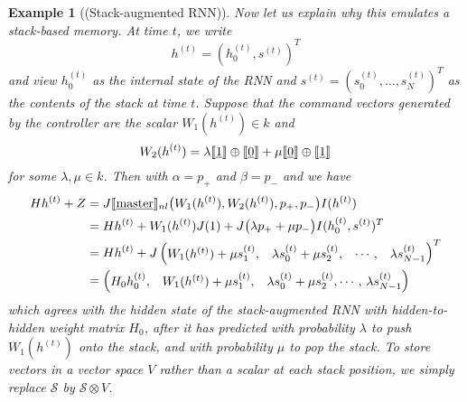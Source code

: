 \documentclass[english,letter paper,12pt,leqno]{article}
\theoremstyle{example}
\newtheorem{example}[theorem]{Example}
\numberwithin{equation}{section}
\begin{document}
\begin{example}[(Stack-augmented RNN)]
Now let us explain why this emulates a stack-based memory. At time $t$, we write
\[
h^{(t)} = (h_0^{(t)}, s^{(t)})^T
\]
and view $h_0^{(t)}$ as the internal state of the RNN and $s^{(t)} = (s_0^{(t)}, \ldots, s_N^{(t)})^T$ as the contents of the stack at time $t$. Suppose that the command vectors generated by the controller are the scalar $W_1(h^{(t)}) \in k$ and
\[
W_2(h^{(t)}) = \lambda \llbracket \underline{1} \rrbracket \oplus \llbracket \underline{0} \rrbracket + \mu \llbracket \underline{0} \rrbracket \oplus \llbracket \underline{1} \rrbracket
\]
for some $\lambda,\mu \in k$.
Then with $\alpha = p_{+}$ and $\beta = p_{-}$ and  we have
\begin{align*}
H h^{(t)} + Z &= J\llbracket \underline{\textup{master}} \rrbracket_{nl}\big( W_1(h^{(t)}), W_2(h^{(t)}), p_+, p_-\big)I( h^{(t)} )\\
&= H h^{(t)} + W_1(h^{(t)}) J(1) + J\big( \lambda p_+ + \mu p_{-} \big)I( h_0^{(t)}, s^{(t)})^T\\
&= H h^{(t)} + J\begin{pmatrix} W_1(h^{(t)}) + \mu s_1^{(t)}, & \lambda s_0^{(t)} + \mu s_2^{(t)}, & \cdots, & \lambda s_{N-1}^{(t)} \end{pmatrix}^T\\
&= \begin{pmatrix}
H_0 h_0^{(t)}, &
W_1(h^{(t)}) + \mu s_1^{(t)}, & 
\lambda s_0^{(t)} + \mu s_2^{(t)},
\cdots,\,
\lambda s_{N-1}^{(t)}
\end{pmatrix}
\end{align*}
which agrees with the hidden state of the stack-augmented RNN \cite{joulin} with hidden-to-hidden weight matrix $H_0$, after it has predicted with probability $\lambda$ to push $W_1(h^{(t)})$ onto the stack, and with probability $\mu$ to pop the stack. To store vectors in a vector space $V$ rather than a scalar at each stack position, we simply replace $\mathscr{S}$ by $\mathscr{S} \otimes V$.
\end{example}
\end{document}
